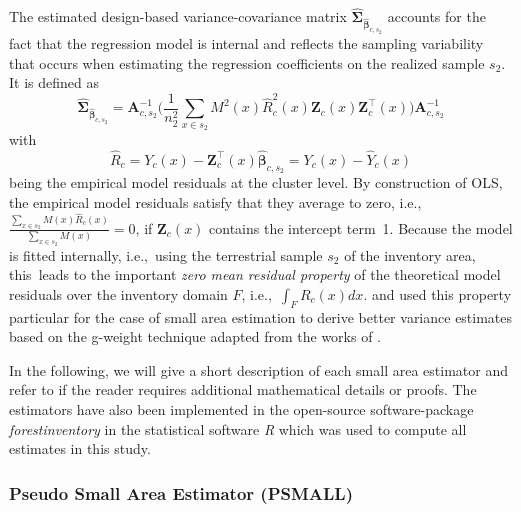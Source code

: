 \documentclass[remotesensing,article,accept,moreauthors,pdftex,10pt,a4paper]{Definitions/mdpi}
\newcommand{\psmall}{PSMALL}
\begin{document}
The estimated design-based variance-covariance matrix $\hat{\pmb{\Sigma}}_{\hat{\pmb{\beta}}_{c,s_2}}$ accounts for the fact that the regression model is internal and reflects the sampling variability that occurs when estimating the regression coefficients on the realized sample $s_2$. It is defined as
\begin{equation}\label{eq:varcovarbeta}
\hat{\pmb{\Sigma}}_{\hat{\pmb{\beta}}_{c,s_2}} = \pmb{A}_{c,s_2}^{-1}
\Big(\frac{1}{n_2^2}\sum_{x\in{s_2}}M^{2}(x)\hat{R}_{c}^2(x)\pmb{Z}_{c}(x)\pmb{Z}_{c}^{\top}(x)\Big)
\pmb{A}_{c,s_2}^{-1}
\end{equation}
with 
\begin{equation}\label{eq:globresids}
\hat{R}_{c} = Y_{c}(x)-\pmb{Z}_{c}^{\top}(x)\hat{\pmb{\beta}}_{c,s_2}  =  Y_{c}(x) - \hat{Y}_{c}(x)
\end{equation}
being the empirical model residuals at the cluster level. By construction of OLS, the empirical model residuals satisfy that they average to zero, i.e.,~$\frac{\sum_{x \in s_{2}} M(x) \hat{R}_{c}(x)}{\sum_{x \in s_{2}} M(x)} = 0$, if $\pmb{Z}_{c}(x)$ contains the intercept term~1. Because the model is fitted internally, i.e.,~using the terrestrial sample $s_2$ of the inventory area, this~leads to the important \textit{zero mean residual property} of the theoretical model residuals over the inventory domain $F$, i.e.,~$\int_{F} R_{c}(x)dx$. \citet{mandallaz2013a} and \citet{mandallaz2013b} used this property particular for the case of small area estimation to derive better variance estimates based on the g-weight technique adapted from the works of \citet{sarndal2003}.

In the following, we will give a short description of each small area estimator and refer to \citet{mandallaz2013a, mandallaz2016, mandallaz2013b} if the reader requires additional mathematical details or proofs. The estimators have also been implemented in the open-source software-package \textit{forestinventory} \citep{forestinventory} in the statistical software \textit{R} \citep{R} which was used to compute all estimates in this study.\\


\subsubsection{Pseudo Small Area Estimator (\psmall{})}
\label{sec:psmall}
\end{document}
